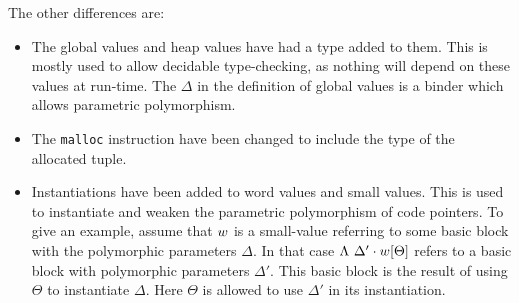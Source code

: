 The other differences are:

\begin{itemize}
\item The global values and heap values have had a type added to them. This is
  mostly used to allow decidable type-checking, as nothing will depend on these
  values at run-time. The $\Delta$ in the definition of global values is a
  binder which allows parametric polymorphism.
\item The \texttt{malloc} instruction have been changed to include the type of
  the allocated tuple.
\item Instantiations have been added to word values and small values. This is
  used to instantiate and weaken the parametric polymorphism of code
  pointers. To give an example, assume that $w$ is a small-value referring
  to some basic block with the polymorphic parameters $\Delta$. In that case
  $\Lambda\ \Delta' \cdot w[\Theta]$ refers to a basic block with
  polymorphic parameters $\Delta'$. This basic block is the result of using
  $\Theta$ to instantiate $\Delta$. Here $\Theta$ is allowed to use $\Delta'$ in
  its instantiation.
\end{itemize}

